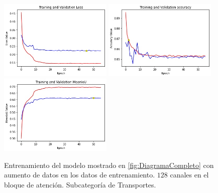 \begin{figure}[htpb]
  \centering
  \includegraphics[width=0.48\textwidth]{../../modelos-entrenados/unet-nonlocal/ejecucion5/loss}
  \includegraphics[width=0.48\textwidth]{../../modelos-entrenados/unet-nonlocal/ejecucion5/acc}
  \includegraphics[width=0.48\textwidth]{../../modelos-entrenados/unet-nonlocal/ejecucion5/iou}
  \caption{Entrenamiento del modelo mostrado en \autoref{fig:DiagramaCompleto} con aumento de datos en los datos de entrenamiento. $128$ canales en el bloque de atención. Subcategoría de Transportes.}
  \label{fig:ejec5}
\end{figure}
